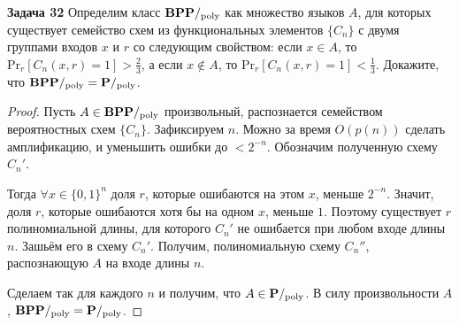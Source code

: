 \textbf{Задача 32} Определим класс $\textbf{BPP}/_{\mathrm{poly}}$ как множество языков $A$, для которых существует семейство схем из функциональных элементов $\{C_n\}$ с двумя группами входов $x$ и $r$ со следующим свойством: если $x\in A$, то $\mathrm{Pr}_r[C_n(x,r)=1]>\frac{2}{3}$, а если $x\not\in A$, то $\mathrm{Pr}_r[C_n(x,r)=1]<\frac{1}{3}$. Докажите, что $\textbf{BPP}/_{\mathrm{poly}}=\textbf{P}/_{\mathrm{poly}}$.

\begin{proof} Пусть $A\in\textbf{BPP}/_{\mathrm{poly}}$ произвольный, распознается семейством вероятностных схем $\{C_n\}$.
Зафиксируем $n$. Можно за время $O(p(n))$ сделать амплификацию, и уменьшить ошибки до $<2^{-n}$. Обозначим полученную схему $C_n'$.

Тогда $\forall x\in\{0,1\}^n$ доля $r$, которые ошибаются на этом $x$, меньше $2^{-n}$. Значит, доля $r$, которые ошибаются хотя бы на одном $x$, меньше $1$. Поэтому существует $r$ полиномиальной длины, для которого $C_n'$ не ошибается при любом входе длины $n$. Зашьём его в схему $C_n'$. Получим, полиномиальную схему $C_n''$, распознающую $A$ на входе длины $n$. 

Сделаем так для каждого $n$ и получим, что $A\in\textbf{P}/_{\mathrm{poly}}$. В силу произвольности $A$, $\textbf{BPP}/_{\mathrm{poly}}=\textbf{P}/_{\mathrm{poly}}$. \end{proof} 